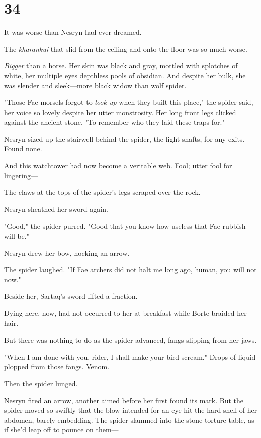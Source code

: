 
\chapter{34}

It was worse than Nesryn had ever dreamed.

The \emph{kharankui} that slid from the ceiling and onto the floor was so much worse.

\emph{Bigger} than a horse. Her skin was black and gray, mottled with splotches of white, her multiple eyes depthless pools of obsidian. And despite her bulk, she was slender and sleek---more black widow than wolf spider.

"Those Fae morsels forgot to \emph{look up} when they built this place," the spider said, her voice so lovely despite her utter monstrosity. Her long front legs clicked against the ancient stone. "To remember who they laid these traps for."

Nesryn sized up the stairwell behind the spider, the light shafts, for any exits. Found none.

And this watchtower had now become a veritable web. Fool; utter fool for lingering---

The claws at the tops of the spider's legs scraped over the rock.

Nesryn sheathed her sword again.

"Good," the spider purred. "Good that you know how useless that Fae rubbish will be."

Nesryn drew her bow, nocking an arrow.

The spider laughed. "If Fae archers did not halt me long ago, human, you will not now."

Beside her, Sartaq's sword lifted a fraction.

Dying here, now, had not occurred to her at breakfast while Borte braided her hair.

But there was nothing to do as the spider advanced, fangs slipping from her jaws.

"When I am done with you, rider, I shall make your bird scream." Drops of liquid plopped from those fangs. Venom.

Then the spider lunged.

Nesryn fired an arrow, another aimed before her first found its mark. But the spider moved so swiftly that the blow intended for an eye hit the hard shell of her abdomen, barely embedding. The spider slammed into the stone torture table, as if she'd leap off to pounce on them---

